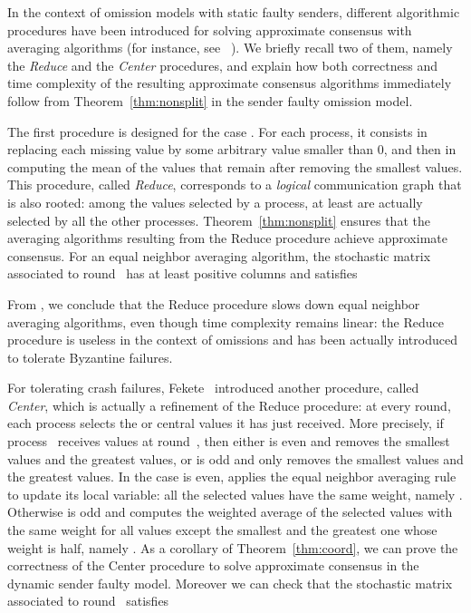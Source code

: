 \documentclass[a4paper]{article}
\theoremstyle{newthm}
\begin{document}
In the context of omission models with static faulty senders, different algorithmic procedures have been introduced 
	for solving approximate consensus with averaging algorithms (for instance, see ~\cite{DLPSW86,Fek90}).
We briefly recall two of them, namely the {\em  Reduce} and the {\em Center} procedures, and explain 
	how both correctness  and time complexity of the resulting
	approximate consensus algorithms immediately follow from Theorem~\ref{thm:nonsplit}
	 in the sender faulty omission model.

The first procedure is designed for the case .
For each process, it consists in replacing each missing value by 
	some arbitrary value smaller than 0, and then in computing the mean of the values 
	that remain  after removing the  smallest values.
This procedure, called {\em Reduce}, corresponds to a {\em logical} communication graph
	that is also rooted: among the  values selected by a process,
	at least  are actually selected by all the other processes.
Theorem~\ref{thm:nonsplit} ensures that the  averaging algorithms resulting from the Reduce procedure
	achieve approximate consensus.
For an equal neighbor averaging algorithm, the stochastic matrix  associated to round~ 
	has at least  positive columns and satisfies 
	 
From  , we conclude that the Reduce procedure  slows down 
	equal neighbor averaging algorithms, even though time complexity remains linear:
	the Reduce procedure is useless in the context of omissions and has been actually  introduced to 
	tolerate Byzantine failures.
	
For tolerating  crash failures, Fekete~\cite{Fek90} introduced another procedure, called {\em Center}, which 
	is actually a refinement of the Reduce procedure:  at every round, each process selects
	 the  or  central values it has just received.
More precisely, if process~ receives  values at round~, then either  is even and  
	removes  the  smallest values and the  greatest values, or 
	 is odd and   only removes the  smallest values and the  greatest values.
In the case  is even,  applies the equal neighbor averaging rule to update its local variable:
	all the selected values have the same weight, namely   .
Otherwise  is odd and  computes the weighted average of the selected values with
	the same weight   for all values except the 
	smallest and the greatest one whose weight is half, namely .
As a corollary of Theorem~\ref{thm:coord}, we can prove the correctness of the Center procedure to solve
	approximate consensus in the dynamic sender faulty model.
Moreover we can check that the  stochastic matrix  associated to round~  satisfies 
	
\end{document}

